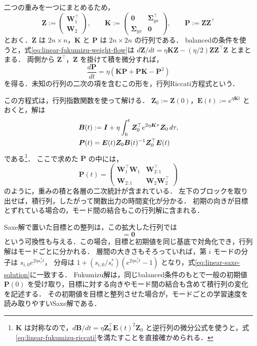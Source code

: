 \documentclass[../main.tex]{subfiles}
\begin{document}
二つの重みを一つにまとめるため，
\begin{equation}
  \bm{Z}:=\begin{pmatrix}\bm{W}_1^\top\\\bm{W}_2\end{pmatrix},
  \qquad
  \bm{K}:=\begin{pmatrix}\bm{0}&\bm{\Sigma}_{yx}^\top\\\bm{\Sigma}_{yx}&\bm{0}\end{pmatrix},
  \qquad
  \bm{P}:=\bm{Z}\bm{Z}^\top
  \label{eq:linear-fukumizu-blocks}
\end{equation}
とおく．$\bm{Z}$ は $2n\times n$，$\bm{K}$ と $\bm{P}$ は $2n\times2n$ の行列である．
balancedの条件を使うと，式\eqref{eq:linear-fukumizu-weight-flow}は
$d\bm{Z}/dt=\eta\bm{K}\bm{Z}-(\eta/2)\bm{Z}\bm{Z}^\top\bm{Z}$ とまとまる．
両側から $\bm{Z}^\top$，$\bm{Z}$ を掛けて積を微分すれば，
\begin{equation}
  \frac{d\bm{P}}{dt}
  =\eta(\bm{K}\bm{P}+\bm{P}\bm{K}-\bm{P}^2)
  \label{eq:linear-fukumizu-riccati}
\end{equation}
を得る．未知の行列の二次の項を含むこの形を，行列Riccati方程式という．

この方程式は，行列指数関数を使って解ける．
$\bm{Z}_0:=\bm{Z}(0)$，$\bm{E}(t):=e^{\eta\bm{K}t}$ とおくと，解は
\begin{align}
  \bm{B}(t)
  &:=\bm{I}+\eta\int_0^t
  \bm{Z}_0^\top e^{2\eta\bm{K}\tau}\bm{Z}_0\,d\tau,
  \notag\\
  \bm{P}(t)
  &=\bm{E}(t)\bm{Z}_0\bm{B}(t)^{-1}\bm{Z}_0^\top\bm{E}(t)
  \label{eq:linear-fukumizu-solution}
\end{align}
である\footnote{$\bm{K}$ は対称なので，$d\bm{B}/dt=\eta\bm{Z}_0^\top\bm{E}(t)^2\bm{Z}_0$ と逆行列の微分公式を使うと，式\eqref{eq:linear-fukumizu-riccati}を満たすことを直接確かめられる．}．
ここで求めた $\bm{P}$ の中には，
\begin{equation}
  \bm{P}(t)
  =\begin{pmatrix}
    \bm{W}_1^\top\bm{W}_1&\bm{W}_{2:1}^\top\\
    \bm{W}_{2:1}&\bm{W}_2\bm{W}_2^\top
  \end{pmatrix}
  \label{eq:linear-fukumizu-observables}
\end{equation}
のように，重みの積と各層の二次統計が含まれている．
左下のブロックを取り出せば，積行列，したがって関数出力の時間変化が分かる．
初期の向きが目標とずれている場合の，モード間の結合もこの行列解に含まれる．

Saxe解で置いた目標との整列は，この拡大した行列では
\begin{equation}
  [\bm{K},\bm{P}(0)]=\bm{0}
  \label{eq:linear-target-commutation}
\end{equation}
という可換性も与える．この場合，目標と初期値を同じ基底で対角化でき，行列解はモードごとに分かれる．
層間の大きさもそろっていれば，第 $i$ モードの分子は $s_{i,0}e^{2\eta s_i^* t}$，
分母は $1+(s_{i,0}/s_i^*)(e^{2\eta s_i^* t}-1)$ となり，式\eqref{eq:linear-saxe-solution}に一致する．
Fukumizu解は，同じbalanced条件のもとで一般の初期値 $\bm{P}(0)$ を受け取り，目標に対する向きやモード間の結合も含めて積行列の変化を記述する．
その初期値を目標と整列させた場合が，モードごとの学習速度を読み取りやすいSaxe解である．
\end{document}
